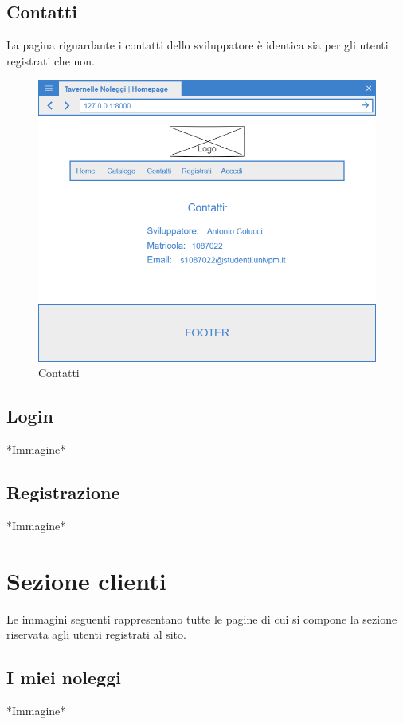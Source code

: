 \documentclass[12pt,a4paperS]{report}
\begin{document}
\begin{normalsize}
			\subsection{Contatti}
				La pagina riguardante i contatti dello sviluppatore è identica sia per gli utenti registrati che non.
				\newline
				\begin{figure}[H]
					\centering
					\includegraphics[width=1\textwidth, height=1\textheight, keepaspectratio]{Mockup/Contatti.png}
					\caption{Contatti}
				\end{figure}
				
			
			\subsection{Login}
				*Immagine*
			
			\subsection{Registrazione}
				*Immagine*
		
		\section{Sezione clienti}
			Le immagini seguenti rappresentano tutte le pagine di cui si compone la sezione riservata agli utenti registrati al sito.
			
			\subsection{I miei noleggi}
				*Immagine*
			

\end{normalsize}
\end{document}
